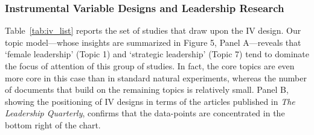 \documentclass[english]{article}
\begin{document}
 
\subsubsection{Instrumental Variable Designs and Leadership Research}

\noindent Table~\ref{tab:iv_list} reports the set of studies that draw upon the
IV design. Our topic model---whose insights are summarized in Figure 5, Panel
A---reveals that `female leadership' (Topic 1) and `strategic leadership' (Topic
7) tend to dominate the focus of attention of this group of studies. In fact,
the core topics are even more core in this case than in standard natural
experiments, whereas the number of documents that build on the remaining topics
is relatively small. Panel B, showing the positioning of IV designs in terms of
the articles published in \emph{The Leadership Quarterly}, confirms that the
data-points are concentrated in the bottom right of the chart.
\end{document}
